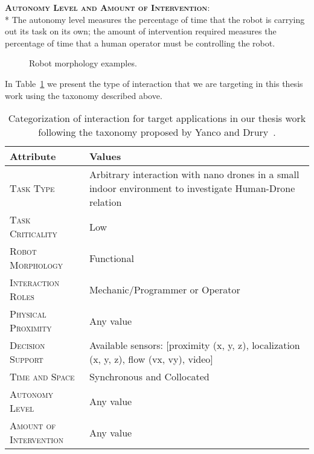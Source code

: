 {\bfseries \scshape Autonomy Level and Amount of Intervention}:\\*
The autonomy level measures the percentage of time that the robot is carrying out its task on its own; 
the amount of intervention required measures the percentage of time that a human operator must be controlling the robot.

\begin{figure}[tb]
    \centering
    \quad
    \quad
    \caption{Robot morphology examples.}\label{fig:robot_morphology}
\end{figure}

In Table~\ref{table:taxonomy_target} we present the type of interaction that we are targeting in this thesis work using the taxonomy described above.

\begin{table}[tb]
\centering
    \begin{tabular}{|p{}|m{}|}
    \hline
    \rowcolor{bluepoli!40}
    \textbf{Attribute} & \textbf{Values} \\
    \hline \hline
    {\scshape Task Type} & Arbitrary interaction with nano drones in a small indoor environment to investigate Human-Drone relation \\
    \hline
    {\scshape Task Criticality} & Low \\
    \hline
    {\scshape Robot Morphology} & Functional \\
    \hline
    {\scshape Interaction Roles} & Mechanic/Programmer or Operator \\
    \hline
    {\scshape Physical Proximity} &  Any value \\
    \hline
    {\scshape Decision Support} & Available sensors: [proximity (x, y, z), localization (x, y, z), flow (vx, vy), video] \\
    \hline
    {\scshape Time and Space} & Synchronous and Collocated \\
    \hline
    {\scshape Autonomy Level} & Any value \\
    \hline
    {\scshape Amount of Intervention} & Any value \\
    \hline
    \end{tabular}
    \\[10pt]
    \caption[Taxonomy for interaction of target applications]{Categorization of interaction for target applications in our thesis work following the taxonomy proposed by Yanco and Drury~\cite{yanco2004taxonomy}.}\label{table:taxonomy_target}
\end{table}


